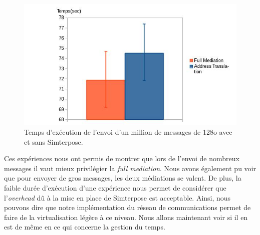 \begin{figure}
  \centering
    \includegraphics[scale=0.5]{mesures/graph/Littlemsg.jpg}
    \caption{Temps d'exécution de l'envoi d'un million de messages de 128o avec et sans Simterpose.}
    \label{Network_Little_Mediation}
\end{figure}

Ces expériences nous ont permis de montrer que lors de l'envoi de nombreux messages il vaut mieux privilégier la \textit{full mediation}. Nous avons également pu voir que pour envoyer de gros messages, les deux médiations se valent. De plus, la faible durée d'exécution d'une expérience nous permet de considérer que l'\textit{overhead} dû à la mise en place de Simterpose est acceptable. Ainsi, nous pouvons dire que notre implémentation du réseau de communications permet de faire de la virtualisation légère à ce niveau. Nous allons maintenant voir si il en est de même en ce qui concerne la gestion du temps.
